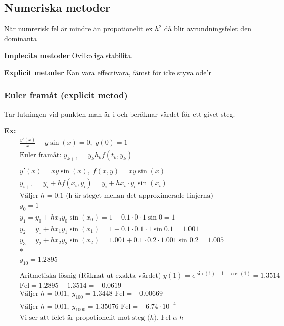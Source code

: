 \subsection{Numeriska metoder}
När numrerisk fel är mindre än propotionelit ex $h^2$ då blir avrundningsfelet den dominanta

\textbf{Implecita metoder}
Ovilkoliga stabilita.

\textbf{Explicit metoder}
Kan vara effectivara, fämst för icke styva ode'r
 
\subsubsection{Euler framåt (explicit metod)}
Tar lutningen vid punkten man är i och beräknar värdet för ett givet steg.

\textbf{Ex:}
\begin{align*}
  &\quad  \frac{y'(x)}{x} - y\sin{(x)} = 0, \; y(0)=1 \\
  &\quad  \text{Euler framåt: } y_{k+1} = y_k h_kf(t_k,y_k) \\
  &\quad  \\
  &\quad  y'(x) = xy\sin{(x)}, \; f(x,y) = xy\sin{(x)} \\
  &\quad  y_{i+1} = y_i + hf(x_i,y_i) = y_i+hx_i\cdot{y_i\sin{(x_i)}} \\
  &\quad  \text{Väljer $h=0.1$ (h är steget mellan det approximerade linjerna)} \\
  &\quad  y_0 = 1 \\
  &\quad  y_1 = y_0+hx_0y_0\sin{(x_0)} = 1+0.1\cdot0\cdot1\sin{0} = 1 \\
  &\quad  y_2 = y_1+hx_1y_1\sin{(x_1)} = 1+0.1\cdot0.1\cdot1\sin{0.1} = 1.001 \\
  &\quad  y_3 = y_2+hx_2y_2\sin{(x_2)} = 1.001+0.1\cdot0.2\cdot1.001\sin{0.2} = 1.005 \\
  &\quad  * \\
  &\quad  y_{10} = 1.2895 \\
  &\quad  \\
  &\quad  \text{Aritmetiska lösnig (Räknat ut exakta värdet) }
  y(1)=e^{\sin{(1)-1-\cos{(1)}}} = 1.3514 \\
  &\quad  \text{Fel} = 1.2895-1.3514 = -0.0619 \\
  &\quad  \text{Väljer } h=0.01, \; y_{100} = 1.3448 \text{ Fel} = -0.00669 \\
  &\quad  \text{Väljer } h=0.01, \; y_{1000} = 1.35076 \text{ Fel} = -6.74\cdot10^{-4} \\
  &\quad  \text{Vi ser att felet är propotionelit mot steg ($h$). Fel } \alpha \; h \\
\end{align*}

